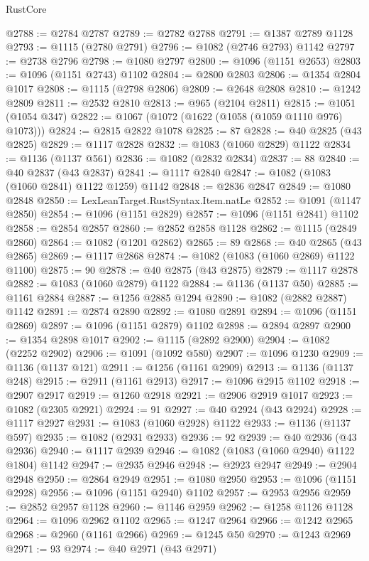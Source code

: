 \begin{lexlean}{RustCore}
\begin{coremodule}
@2788 := @2784 @2787
@2789 := @2782 @2788
@2791 := @1387 @2789 @1128
@2793 := @1115 (@2780 @2791)
@2796 := @1082 (@2746 @2793) @1142
@2797 := @2738 @2796
@2798 := @1080 @2797
@2800 := @1096 (@1151 @2653)
@2803 := @1096 (@1151 @2743) @1102
@2804 := @2800 @2803
@2806 := @1354 @2804 @1017
@2808 := @1115 (@2798 @2806)
@2809 := @2648 @2808
@2810 := @1242 @2809
@2811 := @2532 @2810
@2813 := @965 (@2104 @2811)
@2815 := @1051 (@1054 @347)
@2822 := @1067 (@1072 (@1622 (@1058 (@1059 @1110 @976) @1073)))
@2824 := @2815 @2822 @1078
@2825 := 87
@2828 := @40 @2825 (@43 @2825)
@2829 := @1117 @2828
@2832 := @1083 (@1060 @2829) @1122
@2834 := @1136 (@1137 @561)
@2836 := @1082 (@2832 @2834)
@2837 := 88
@2840 := @40 @2837 (@43 @2837)
@2841 := @1117 @2840
@2847 := @1082 (@1083 (@1060 @2841) @1122 @1259) @1142
@2848 := @2836 @2847
@2849 := @1080 @2848
@2850 := LexLeanTarget.RustSyntax.Item.natLe
@2852 := @1091 (@1147 @2850)
@2854 := @1096 (@1151 @2829)
@2857 := @1096 (@1151 @2841) @1102
@2858 := @2854 @2857
@2860 := @2852 @2858 @1128
@2862 := @1115 (@2849 @2860)
@2864 := @1082 (@1201 @2862)
@2865 := 89
@2868 := @40 @2865 (@43 @2865)
@2869 := @1117 @2868
@2874 := @1082 (@1083 (@1060 @2869) @1122 @1100)
@2875 := 90
@2878 := @40 @2875 (@43 @2875)
@2879 := @1117 @2878
@2882 := @1083 (@1060 @2879) @1122
@2884 := @1136 (@1137 @50)
@2885 := @1161 @2884
@2887 := @1256 @2885 @1294
@2890 := @1082 (@2882 @2887) @1142
@2891 := @2874 @2890
@2892 := @1080 @2891
@2894 := @1096 (@1151 @2869)
@2897 := @1096 (@1151 @2879) @1102
@2898 := @2894 @2897
@2900 := @1354 @2898 @1017
@2902 := @1115 (@2892 @2900)
@2904 := @1082 (@2252 @2902)
@2906 := @1091 (@1092 @580)
@2907 := @1096 @1230
@2909 := @1136 (@1137 @121)
@2911 := @1256 (@1161 @2909)
@2913 := @1136 (@1137 @248)
@2915 := @2911 (@1161 @2913)
@2917 := @1096 @2915 @1102
@2918 := @2907 @2917
@2919 := @1260 @2918
@2921 := @2906 @2919 @1017
@2923 := @1082 (@2305 @2921)
@2924 := 91
@2927 := @40 @2924 (@43 @2924)
@2928 := @1117 @2927
@2931 := @1083 (@1060 @2928) @1122
@2933 := @1136 (@1137 @597)
@2935 := @1082 (@2931 @2933)
@2936 := 92
@2939 := @40 @2936 (@43 @2936)
@2940 := @1117 @2939
@2946 := @1082 (@1083 (@1060 @2940) @1122 @1804) @1142
@2947 := @2935 @2946
@2948 := @2923 @2947
@2949 := @2904 @2948
@2950 := @2864 @2949
@2951 := @1080 @2950
@2953 := @1096 (@1151 @2928)
@2956 := @1096 (@1151 @2940) @1102
@2957 := @2953 @2956
@2959 := @2852 @2957 @1128
@2960 := @1146 @2959
@2962 := @1258 @1126 @1128
@2964 := @1096 @2962 @1102
@2965 := @1247 @2964
@2966 := @1242 @2965
@2968 := @2960 (@1161 @2966)
@2969 := @1245 @50
@2970 := @1243 @2969
@2971 := 93
@2974 := @40 @2971 (@43 @2971)

\end{coremodule}
\end{lexlean}
